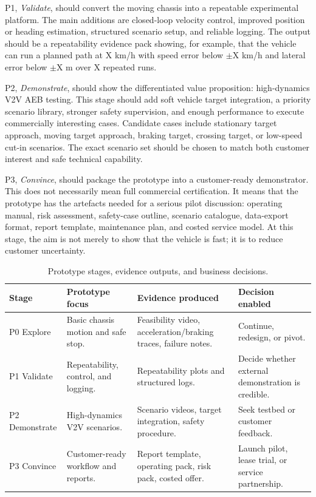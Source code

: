P1, \textit{Validate}, should convert the moving chassis into a repeatable experimental platform. The main additions are closed-loop velocity control, improved position or heading estimation, structured scenario setup, and reliable logging. The output should be a repeatability evidence pack showing, for example, that the vehicle can run a planned path at X km/h with speed error below $\pm$X km/h and lateral error below $\pm$X m over X repeated runs.

P2, \textit{Demonstrate}, should show the differentiated value proposition: high-dynamics V2V AEB testing. This stage should add soft vehicle target integration, a priority scenario library, stronger safety supervision, and enough performance to execute commercially interesting cases. Candidate cases include stationary target approach, moving target approach, braking target, crossing target, or low-speed cut-in scenarios. The exact scenario set should be chosen to match both customer interest and safe technical capability.

P3, \textit{Convince}, should package the prototype into a customer-ready demonstrator. This does not necessarily mean full commercial certification. It means that the prototype has the artefacts needed for a serious pilot discussion: operating manual, risk assessment, safety-case outline, scenario catalogue, data-export format, report template, maintenance plan, and costed service model. At this stage, the aim is not merely to show that the vehicle is fast; it is to reduce customer uncertainty.

\begin{table}[H]
\centering
\caption{Prototype stages, evidence outputs, and business decisions.}
\label{tab:prototype_stages_compact}
\begin{tabular}{p{} p{} p{} p{}}
\toprule
\textbf{Stage} & \textbf{Prototype focus} & \textbf{Evidence produced} & \textbf{Decision enabled} \\
\midrule
P0 Explore & Basic chassis motion and safe stop. & Feasibility video, acceleration/braking traces, failure notes. & Continue, redesign, or pivot. \\
P1 Validate & Repeatability, control, and logging. & Repeatability plots and structured logs. & Decide whether external demonstration is credible. \\
P2 Demonstrate & High-dynamics V2V scenarios. & Scenario videos, target integration, safety procedure. & Seek testbed or customer feedback. \\
P3 Convince & Customer-ready workflow and reports. & Report template, operating pack, risk pack, costed offer. & Launch pilot, lease trial, or service partnership. \\
\bottomrule
\end{tabular}
\end{table}

